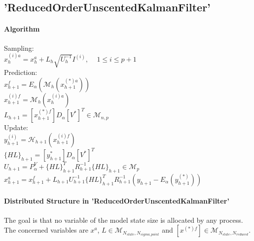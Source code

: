 \documentclass{tufte-book}
\begin{document}
\hypertarget{seq-par-roukf}{}\subsection{'ReducedOrderUnscentedKalmanFilter'}\label{seq-par-roukf}


\hypertarget{seq-par-rouk-algof}{}\paragraph{Algorithm}\label{seq-par-roukf-algo}

Sampling:\\
  $ x_{h}^{(i)a} = x_h^a + L_h\sqrt{U_h^{-1}}I^{(i)} \textrm{, } \quad 1\leq i \leq p+1 $\\
  Prediction:\\
  $ x_{h+1}^f = E_\alpha(\mathcal{M}_{h}(x_{h+1}^{(*)a})) $\\
  $ x_{h+1}^{(i)f} = \mathcal{M}_{h}(x_{h}^{(i)a})$\\
  $ L_{h+1} = [x_{h+1}^{(*)f}]D_\alpha [V^*]^T \in \mathcal{M}_{n,p} $\\

  Update:\\
  $ y_{h+1}^{(i)} = \mathcal{H}_{h+1}(x_{h+1}^{(i)f})$\\
  $ \{HL\}_{h+1} = [y_{h+1}^{*}]D_\alpha [V^*]^T$\\
  $ U_{h+1} = P_{\alpha}^V +  \{HL\}_{h+1}^T R_{h+1}^{-1} \{HL\}_{h+1} \in \mathcal{M}_{p}$\\
  $ x_{h+1}^a = x_{h+1}^f + L_{h+1}U_{h+1}^{-1}\{HL\}_{h+1}^T R_{h+1}^{-1} (y_{h+1}-E_\alpha(y_{h+1}^{(*)}))$\\




\hypertarget{seq-par-roukf-ds}{}\paragraph{Distributed Structure in 'ReducedOrderUnscentedKalmanFilter'}\label{seq-par-roukf-ds}


The goal is that no variable of the model state size is allocated by any process. The concerned variables are  $x^a$, $L \in \mathcal{M}_{N_{state}, N_{sigma\_point}}$ and $ [x^{(*)f}] \in \mathcal{M}_{N_{state}, N_{reduced}}$.
\end{document}
